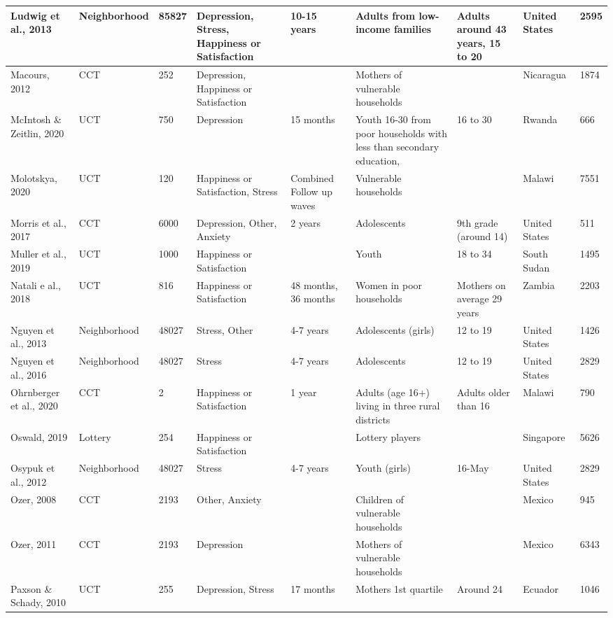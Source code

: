 \begin{longtable}{p{1.8cm}p{1.7cm}p{1.3 cm}p{1.8cm}p{1.7cm}p{1.8cm}p{1cm}p{1.2cm}p{1cm}}
Ludwig et al., 2013 & Neighborhood & 85827 & Depression, Stress, Happiness or Satisfaction & 10-15 years & Adults from low-income families & Adults around 43 years, 15 to 20 & United States & 2595 \\ 
   \hline
Macours, 2012 & CCT & 252 & Depression, Happiness or Satisfaction &  & Mothers of vulnerable households &  & Nicaragua & 1874 \\ 
   \hline
McIntosh \& Zeitlin, 2020 & UCT & 750 & Depression & 15 months & Youth 16-30 from poor households with less than secondary education, & 16 to 30 & Rwanda & 666 \\ 
   \hline
Molotskya, 2020 & UCT & 120 & Happiness or Satisfaction, Stress & Combined Follow up waves & Vulnerable households &  & Malawi & 7551 \\ 
   \hline
Morris et al., 2017 & CCT & 6000 & Depression, Other, Anxiety & 2 years & Adolescents & 9th grade (around 14) & United States & 511 \\ 
   \hline
Muller et al., 2019 & UCT & 1000 & Happiness or Satisfaction &  & Youth & 18 to 34 & South Sudan & 1495 \\ 
   \hline
Natali e al., 2018 & UCT & 816 & Happiness or Satisfaction & 48 months, 36 months & Women in poor households & Mothers on average 29 years & Zambia & 2203 \\ 
   \hline
Nguyen et al., 2013 & Neighborhood & 48027 & Stress, Other & 4-7 years & Adolescents (girls) & 12 to 19 & United States & 1426 \\ 
   \hline
Nguyen et al., 2016 & Neighborhood & 48027 & Stress & 4-7 years & Adolescents & 12 to 19 & United States & 2829 \\ 
   \hline
Ohrnberger et al., 2020 & CCT & 2 & Happiness or Satisfaction & 1 year & Adults (age 16+) living in three rural districts & Adults older than 16 & Malawi & 790 \\ 
   \hline
Oswald, 2019 & Lottery & 254 & Happiness or Satisfaction &  & Lottery players &  & Singapore & 5626 \\ 
   \hline
Osypuk et al., 2012 & Neighborhood & 48027 & Stress & 4-7 years & Youth (girls) & 16-May & United States & 2829 \\ 
   \hline
Ozer, 2008 & CCT & 2193 & Other, Anxiety &  & Children of vulnerable households &  & Mexico & 945 \\ 
   \hline
Ozer, 2011 & CCT & 2193 & Depression &  & Mothers of vulnerable households &  & Mexico & 6343 \\ 
   \hline
Paxson \& Schady, 2010 & UCT & 255 & Depression, Stress & 17 months & Mothers 1st quartile & Around 24 & Ecuador & 1046 \\ 

\end{longtable}
